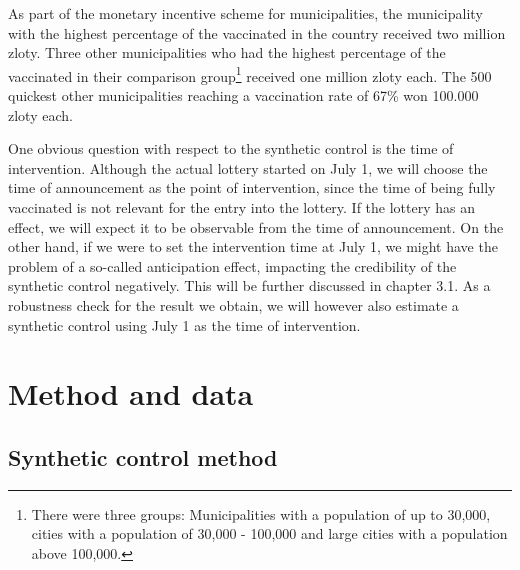 \documentclass{scrbook}
\begin{document}
As part of the monetary incentive scheme for municipalities, the
municipality with the highest percentage of the vaccinated in the
country received two million zloty. Three other municipalities who had
the highest percentage of the vaccinated in their comparison
group\footnote{There were three groups: Municipalities with a population of up to 30,000, cities with a population of 30,000 - 100,000 and large cities with a population above 100,000.}
received one million zloty each. The 500 quickest other municipalities
reaching a vaccination rate of 67\% won 100.000 zloty each.

One obvious question with respect to the synthetic control is the time
of intervention. Although the actual lottery started on July 1, we will
choose the time of announcement as the point of intervention, since the
time of being fully vaccinated is not relevant for the entry into the
lottery. If the lottery has an effect, we will expect it to be
observable from the time of announcement. On the other hand, if we were
to set the intervention time at July 1, we might have the problem of a
so-called anticipation effect, impacting the credibility of the
synthetic control negatively. This will be further discussed in chapter
3.1. As a robustness check for the result we obtain, we will however
also estimate a synthetic control using July 1 as the time of
intervention.

\chapter{Method and data}

\section{Synthetic control method}
\end{document}

